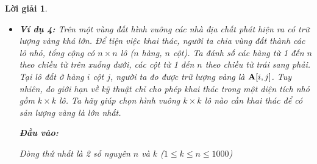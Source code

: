 \documentclass[14pt, a4paper]{article}
\theoremstyle{sltheorem}
\theoremstyle{soltheorem}
\newtheorem*{loigiai}{Lời giải}
\begin{document}
\begin{loigiai}
\begin{itemize} [label={$-$}]
        \begin{itemize}
            \item Với đầu vào:
            \begin{verbatim}
                5
                4 10 3 12 20 7
            \end{verbatim}
            Kết quả đầu ra:
            \begin{verbatim}
                1344
                ((A_1A_2)((A_3A_4)A_5))
            \end{verbatim}
            \item Với đầu vào:
            \begin{verbatim}
                10
                5 10 12 7 8 6 8 12 18 20 5
            \end{verbatim}
            Kết quả đầu ra:
            \begin{verbatim}
                (((((A_1A_2)A_3)A_4)A_5)(A_6(A_7(A_8(A_9A_10)))))
            \end{verbatim}
            \item Với đầu vào:
            \begin{verbatim}
                10
                10 15 12 18 25 20 19 18 28 22 20
            \end{verbatim}
            Kết quả đầu ra:
            \begin{verbatim}
                (((((((((A_1A_2)A_3)A_4)A_5)A_6)A_7)A_8)A_9)A_10)
            \end{verbatim}
        \end{itemize}
        
        \item \textbf{Ví dụ 4:} Trên một vùng đất hình vuông các nhà địa chất phát hiện ra có trữ lượng vàng khá lớn.
        Để tiện việc khai thác, người ta chia vùng đất thành các lô nhỏ, tổng cộng có $n \times n$ lô ($n$ hàng, $n$ cột).
        Ta đánh số các hàng từ 1 đến $n$ theo chiều từ trên xuống dưới,
        các cột từ 1 đến $n$ theo chiều từ trái sang phải. Tại lô đất ở hàng $i$ cột $j$,
        người ta đo được trữ lượng vàng là $\bold{A} \lbrack i, j \rbrack$.
        Tuy nhiên, do giới hạn về kỹ thuật chỉ cho phép khai thác trong một diện tích nhỏ gồm $k \times k$ lô.
        Ta hãy giúp chọn hình vuông $k \times k$ lô nào cần khai thác để có sản lượng vàng là lớn nhất.
        
        \textbf{Đầu vào:}

        Dòng thứ nhất là 2 số nguyên $n$ và $k$ ($1 \leq k \leq n \leq 1000$)


\end{itemize}
\end{loigiai}
\end{document}

